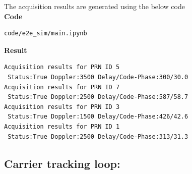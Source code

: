 The acquisition results are generated using the below code\\
\textbf{Code}
\begin{lstlisting}
code/e2e_sim/main.ipynb
\end{lstlisting}
\textbf{Result}
\begin{lstlisting}
Acquisition results for PRN ID 5
 Status:True Doppler:3500 Delay/Code-Phase:300/30.0
Acquisition results for PRN ID 7
 Status:True Doppler:2500 Delay/Code-Phase:587/58.7
Acquisition results for PRN ID 3
 Status:True Doppler:1500 Delay/Code-Phase:426/42.6
Acquisition results for PRN ID 1
 Status:True Doppler:2500 Delay/Code-Phase:313/31.3
\end{lstlisting}


\subsection{Carrier tracking loop:}

